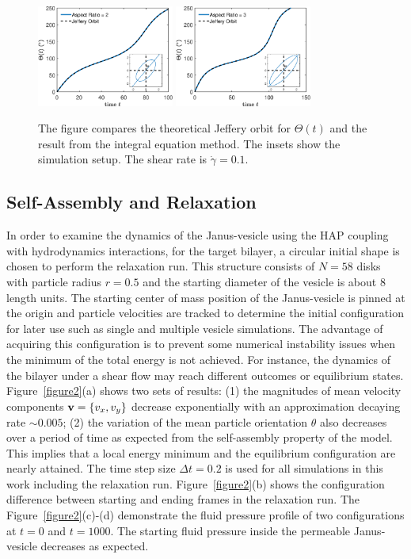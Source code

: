 \documentclass[lineno]{jfm}
\begin{document}
\begin{figure}
\centering
\includegraphics[width=0.4\textwidth]{JefferyOrbit2.eps}
\includegraphics[width=0.4\textwidth]{JefferyOrbit3.eps}
  \caption{The figure compares the theoretical Jeffery orbit for $\Theta(t)$ and the result from the integral equation method. 
    The insets show the simulation setup. The shear rate is $\dot\gamma=0.1$.}
    \label{figure1}
\end{figure}

\subsection{Self-Assembly and Relaxation}

In order to examine the dynamics of the Janus-vesicle using the HAP coupling with hydrodynamics interactions, for the target bilayer, a circular initial shape is chosen to perform the relaxation run. 
This structure consists of $N=58$ disks with particle radius $r=0.5$ and the starting diameter of 
the vesicle is about $8$ length units.
The starting center of mass position of the Janus-vesicle is pinned at the origin and particle velocities are tracked to determine the initial configuration for later use such as single and multiple vesicle simulations. 
The advantage of acquiring this configuration is to prevent some numerical instability issues when the minimum of the total energy is not achieved. 
For instance, the dynamics of the bilayer under a shear flow may reach different outcomes or equilibrium states.
Figure~\ref{figure2}(a) shows two sets of results: (1) the magnitudes of mean velocity components 
${\bf v}=\{v_x,v_y\}$ decrease exponentially with an approximation decaying rate $\sim0.005$; (2) the variation of the mean particle orientation $\theta$ also decreases over a period of time as expected from the self-assembly property of the model. This implies that a local energy minimum and the equilibrium configuration are nearly attained. 
The time step size $\Delta t=0.2$ is used for all simulations in this work including the relaxation run.
Figure~\ref{figure2}(b) shows the configuration difference between starting and ending frames in the relaxation run. The Figure~\ref{figure2}(c)-(d) demonstrate the fluid pressure profile of two configurations at $t=0$ and $t=1000$. The starting fluid pressure inside the permeable Janus-vesicle decreases as expected.
\end{document}
